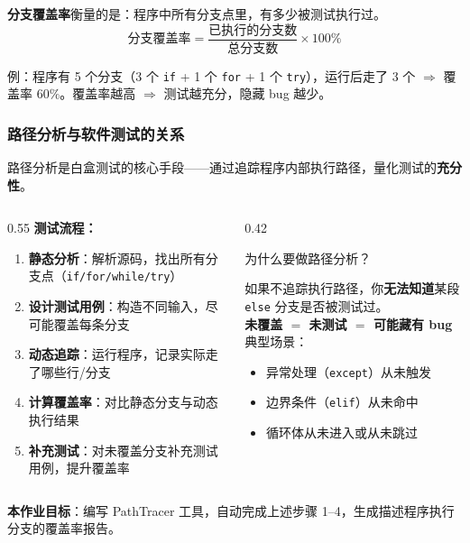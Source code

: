 \documentclass[presentation,aspectratio=169,fontset=none]{ctexbeamer}
\begin{document}
\begin{frame}[fragile]
\vspace{0.15cm}
{\small\textbf{分支覆盖率}衡量的是：程序中所有分支点里，有多少被测试执行过。}
\[
\text{分支覆盖率} = \frac{\text{已执行的分支数}}{\text{总分支数}} \times 100\%
\]

{\small 例：程序有 5 个分支（3 个 \texttt{if} + 1 个 \texttt{for} + 1 个 \texttt{try}），运行后走了 3 个 $\Rightarrow$ 覆盖率 $60\%$。覆盖率越高 $\Rightarrow$ 测试越充分，隐藏 bug 越少。}
\end{frame}


\begin{frame}
\frametitle{路径分析与软件测试的关系}
{\small 路径分析是白盒测试的核心手段——通过追踪程序内部执行路径，量化测试的\textbf{充分性}。}

\vspace{0.15cm}
\begin{columns}[T]
\begin{column}{0.55\textwidth}
{\small\textbf{测试流程：}}
\begin{enumerate}\setlength{\itemsep}{1pt}
    \item \textbf{静态分析}：解析源码，找出所有分支点（\texttt{if/for/while/try}）
    \item \textbf{设计测试用例}：构造不同输入，尽可能覆盖每条分支
    \item \textbf{动态追踪}：运行程序，记录实际走了哪些行/分支
    \item \textbf{计算覆盖率}：对比静态分支与动态执行结果
    \item \textbf{补充测试}：对未覆盖分支补充测试用例，提升覆盖率
\end{enumerate}
\end{column}
\begin{column}{0.42\textwidth}
\begin{alertblock}{\small 为什么要做路径分析？}
{\scriptsize
如果不追踪执行路径，你\textbf{无法知道}某段 \texttt{else} 分支是否被测试过。\\[3pt]
\textbf{未覆盖 $=$ 未测试 $=$ 可能藏有 bug}\\[3pt]
典型场景：
\begin{itemize}\setlength{\itemsep}{0pt}
    \item 异常处理（\texttt{except}）从未触发
    \item 边界条件（\texttt{elif}）从未命中
    \item 循环体从未进入或从未跳过
\end{itemize}}
\end{alertblock}
\end{column}
\end{columns}

\vspace{0.15cm}
{\small\textbf{本作业目标}：编写 PathTracer 工具，自动完成上述步骤 1–4，生成描述程序执行分支的覆盖率报告。}
\end{frame}
\end{document}
